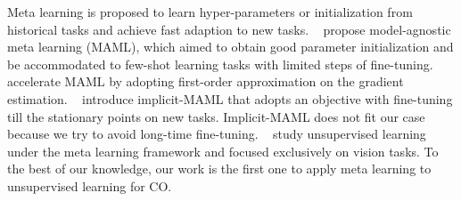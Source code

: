 
Meta learning is proposed to learn hyper-parameters or initialization from historical tasks and achieve fast adaption to new tasks. ~\cite{finn2017model} propose model-agnostic meta learning (MAML), which aimed to obtain good parameter initialization and be accommodated to few-shot learning tasks with limited steps of fine-tuning. ~\cite{nichol2018first} accelerate MAML by adopting first-order approximation on the gradient estimation. ~\cite{rajeswaran2019meta} introduce implicit-MAML that adopts an objective with fine-tuning till the stationary points on new tasks. Implicit-MAML does not fit our case because we try to avoid long-time fine-tuning. ~\cite{hsu2018unsupervised} study unsupervised learning under the meta learning framework and focused exclusively on vision tasks. To the best of our knowledge, our work is the first one to apply meta learning to unsupervised learning for CO. %

